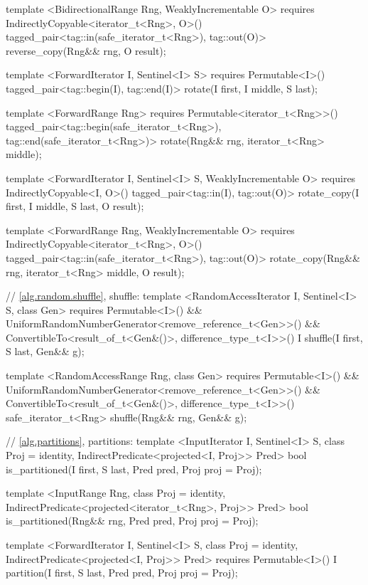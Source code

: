 \begin{codeblock}
{{{{  template <BidirectionalRange Rng, WeaklyIncrementable O>
    requires IndirectlyCopyable<iterator_t<Rng>, O>()
    tagged_pair<tag::in(safe_iterator_t<Rng>), tag::out(O)>
      reverse_copy(Rng&& rng, O result);

  template <ForwardIterator I, Sentinel<I> S>
    requires Permutable<I>()
    tagged_pair<tag::begin(I), tag::end(I)>
      rotate(I first, I middle, S last);

  template <ForwardRange Rng>
    requires Permutable<iterator_t<Rng>>()
    tagged_pair<tag::begin(safe_iterator_t<Rng>),
                tag::end(safe_iterator_t<Rng>)>
      rotate(Rng&& rng, iterator_t<Rng> middle);

  template <ForwardIterator I, Sentinel<I> S, WeaklyIncrementable O>
    requires IndirectlyCopyable<I, O>()
    tagged_pair<tag::in(I), tag::out(O)>
      rotate_copy(I first, I middle, S last, O result);

  template <ForwardRange Rng, WeaklyIncrementable O>
    requires IndirectlyCopyable<iterator_t<Rng>, O>()
    tagged_pair<tag::in(safe_iterator_t<Rng>), tag::out(O)>
      rotate_copy(Rng&& rng, iterator_t<Rng> middle, O result);

  // \ref{alg.random.shuffle}, shuffle:
  template <RandomAccessIterator I, Sentinel<I> S, class Gen>
    requires Permutable<I>() &&
      UniformRandomNumberGenerator<remove_reference_t<Gen>>() &&
      ConvertibleTo<result_of_t<Gen&()>, difference_type_t<I>>()
    I shuffle(I first, S last, Gen&& g);

  template <RandomAccessRange Rng, class Gen>
    requires Permutable<I>() &&
      UniformRandomNumberGenerator<remove_reference_t<Gen>>() &&
      ConvertibleTo<result_of_t<Gen&()>, difference_type_t<I>>()
    safe_iterator_t<Rng>
      shuffle(Rng&& rng, Gen&& g);

  // \ref{alg.partitions}, partitions:
  template <InputIterator I, Sentinel<I> S, class Proj = identity,
      IndirectPredicate<projected<I, Proj>> Pred>
    bool is_partitioned(I first, S last, Pred pred, Proj proj = Proj{});

  template <InputRange Rng, class Proj = identity,
      IndirectPredicate<projected<iterator_t<Rng>, Proj>> Pred>
    bool
      is_partitioned(Rng&& rng, Pred pred, Proj proj = Proj{});

  template <ForwardIterator I, Sentinel<I> S, class Proj = identity,
      IndirectPredicate<projected<I, Proj>> Pred>
    requires Permutable<I>()
    I partition(I first, S last, Pred pred, Proj proj = Proj{});

}}}}
\end{codeblock}
